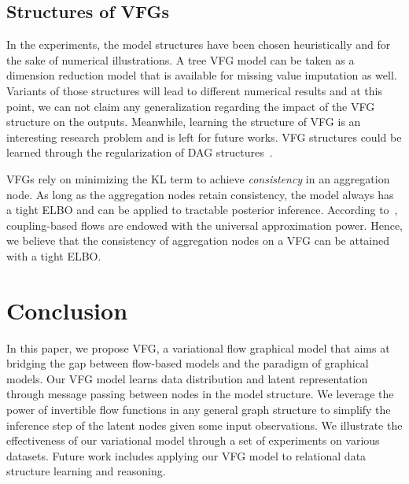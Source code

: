 \documentclass[sigconf, anonymous, review]{acmart}
\theoremstyle{plain}
\theoremstyle{definition}
\theoremstyle{remark}
\begin{document}
\subsection{Structures of VFGs}
 In the experiments, the model structures have been chosen heuristically and for the sake of numerical illustrations. A tree VFG model can be taken as a dimension reduction model that is available for missing value imputation as well. Variants of those structures will lead to different numerical results and at this point, we can not claim any generalization regarding the impact of the VFG structure on the outputs. Meanwhile, learning the structure of VFG is an interesting research problem and is left for future works.  VFG structures could be learned through the regularization of DAG structures~\cite{Zheng2018,wehenkel2021graphical}.
 
 VFGs rely on minimizing the KL term to achieve  \emph{consistency} in an aggregation node. As long as the aggregation nodes retain consistency, the model always has a tight ELBO and can be applied to tractable posterior inference. 
 According to~\cite{teshima2020coupling}, coupling-based flows are endowed with the universal approximation power. 
 Hence, we believe that the consistency of aggregation nodes on a  VFG can be attained with a tight ELBO. 




\section{Conclusion}\label{sec:conclusion}
In this paper, we propose VFG, a variational flow graphical model that aims at bridging the gap between  flow-based models and the paradigm of graphical models.
Our VFG model learns  data distribution and latent representation  through message passing between nodes in the model structure.
We leverage the power of invertible flow functions in any general graph structure to simplify the inference step of the latent nodes given some input observations.
We illustrate the effectiveness of our variational model through a set of experiments on various datasets. 
Future work includes applying our VFG model to  relational data structure learning and reasoning. 
\end{document}
